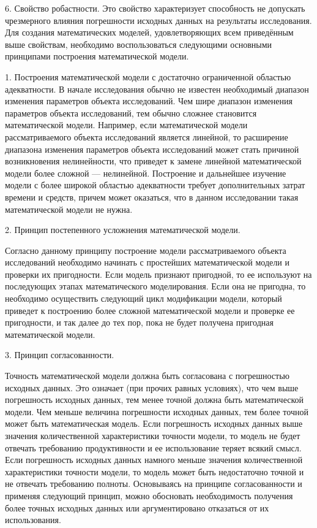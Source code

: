 6. Свойство робастности. Это свойство характеризует способность не допускать чрезмерного влияния погрешности исходных данных на результаты исследования.
Для создания математических моделей, удовлетворяющих всем приведённым выше свойствам, необходимо воспользоваться следующими основными принципами построения математической модели.


1. Построения математической модели с достаточно ограниченной областью адекватности. В начале исследования обычно не известен необходимый диапазон изменения параметров объекта исследований. Чем шире диапазон изменения параметров объекта исследований, тем обычно сложнее становится математической модели. Например, если математической модели рассматриваемого объекта исследований является линейной, то расширение диапазона изменения параметров объекта исследований может стать причиной возникновения нелинейности, что приведет к замене линейной математической модели более сложной — нелинейной. Построение и дальнейшее изучение модели с более широкой областью адекватности требует дополнительных затрат времени и средств, причем может оказаться, что в данном исследовании такая математической модели не нужна. 


2. Принцип постепенного усложнения математической модели. 


Согласно данному принципу построение модели рассматриваемого объекта исследований необходимо начинать с простейших математической модели и проверки их пригодности. Если модель признают пригодной, то ее используют на последующих этапах математического моделирования. Если она не пригодна, то необходимо осуществить следующий цикл модификации модели, который приведет к построению более сложной математической модели и проверке ее пригодности, и так далее до тех пор, пока не будет получена пригодная математической модели. 


3. Принцип согласованности. 

Точность математической модели должна быть согласована с погрешностью исходных данных. Это означает (при прочих равных условиях), что чем выше погрешность исходных данных, тем менее точной должна быть математической модели. Чем меньше величина погрешности исходных данных, тем более точной может быть математическая модель.
Если погрешность исходных данных выше значения количественной характеристики точности модели, то модель не будет отвечать требованию продуктивности и ее использование теряет всякий смысл. Если погрешность исходных данных намного меньше значения количественной характеристики точности модели, то модель может быть недостаточно точной и не отвечать требованию полноты.
Основываясь на принципе согласованности и применяя следующий принцип, можно обосновать необходимость получения более точных исходных данных или аргументировано отказаться от их использования.


